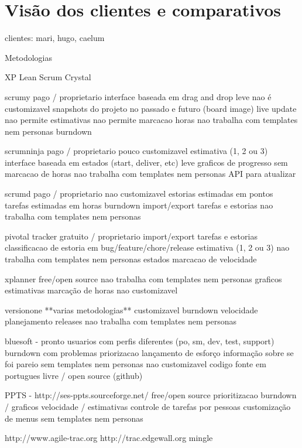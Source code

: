 \section{Visão dos clientes e comparativos}

clientes: mari, hugo, caelum

Metodologias

XP
Lean
Scrum
Crystal


scrumy
	pago / proprietario
	interface baseada em drag and drop
	leve
	nao é customizavel
	snapshots do projeto no passado e futuro (board image)
	live update
	nao permite estimativas
	nao permite marcacao horas
	nao trabalha com templates nem personas
	burndown
	
scrumninja
	pago / proprietario
	pouco customizavel
	estimativa (1, 2 ou 3)
	interface baseada em estados (start, deliver, etc)
	leve
	graficos de progresso
	sem marcacao de horas
	nao trabalha com templates nem personas
	API para atualizar 

scrumd
  pago / proprietario
  nao customizavel
  estorias estimadas em pontos
  tarefas estimadas em horas
  burndown
	import/export tarefas e estorias
	nao trabalha com templates nem personas

pivotal tracker
	gratuito / proprietario
	import/export tarefas e estorias
	classificacao de estoria em bug/feature/chore/release
	estimativa (1, 2 ou 3)
	nao trabalha com templates nem personas
	estados
	marcacao de velocidade
	
xplanner
	free/open source
	nao trabalha com templates nem personas
	graficos
	estimativas
	marcação de horas
	nao customizavel
	
versionone
	**varias metodologias**
	customizavel
	burndown
	velocidade
	planejamento releases
	nao trabalha com templates nem personas

bluesoft - pronto
	usuarios com perfis diferentes (po, sm, dev, test, support)
	burndown com problemas
	priorizacao
	lançamento de esforço
	informação sobre se foi pareio
	sem templates nem personas
	nao customizavel
	codigo fonte em portugues
	livre / open source (github)

PPTS - http://ses-ppts.sourceforge.net/
	free/open source
	prioritizacao
	burndown / graficos
	velocidade / estimativas
	controle de tarefas por pessoas
	customização de menus
	sem templates nem personas

http://www.agile-trac.org
http://trac.edgewall.org
mingle

